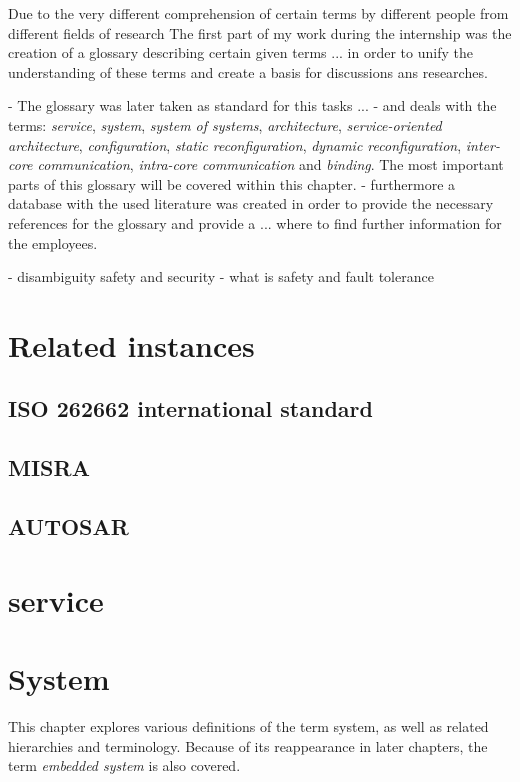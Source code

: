 Due to the very different comprehension of certain terms by different people from different fields of research 
The first part of my work during the internship was the creation of a glossary describing certain given terms
... in order to unify the understanding of these terms and create a basis for discussions ans researches.

- The glossary was later taken as standard for this tasks ...
- and deals with the terms: \emph{service}, \emph{system}, \emph{system of systems}, \emph{architecture}, \emph{service-oriented architecture}, \emph{configuration}, \emph{static reconfiguration}, \emph{dynamic reconfiguration}, \emph{inter-core communication}, \emph{intra-core communication} and \emph{binding}.
The most important parts of this glossary will be covered within this chapter.
- furthermore a database with the used literature was created in order to provide the necessary references for the glossary and provide a ... where to find further information for the employees. 

- disambiguity safety and security
- what is safety and fault tolerance

\section{Related instances}
\subsection{ISO 262662 international standard}
\subsection{MISRA}
\subsection{AUTOSAR}
\section{service}




\section{System}

\label{ch:system}
This chapter explores various definitions of the term system, as well as related hierarchies and terminology. Because of its reappearance in later chapters, the term \emph{embedded system} is also covered.

